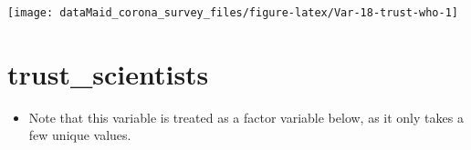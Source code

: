 \documentclass[
]{report}
\providecommand{\tightlist}{%
  \setlength{\itemsep}{0pt}\setlength{\parskip}{0pt}}
\begin{document}
\begin{minipage}{0.25 \textwidth}

\begin{center}\texttt{[image: dataMaid\_corona\_survey\_files/figure-latex/Var-18-trust-who-1]} \end{center}

\end{minipage}

\noindent\makebox[\linewidth]{\rule{\textwidth}{0.4pt}}

\hypertarget{trust_scientists}{%
\section{trust\_scientists}\label{trust_scientists}}

\begin{itemize}
\tightlist
\item
  Note that this variable is treated as a factor variable below, as it
  only takes a few unique values.
\end{itemize}
\end{document}
